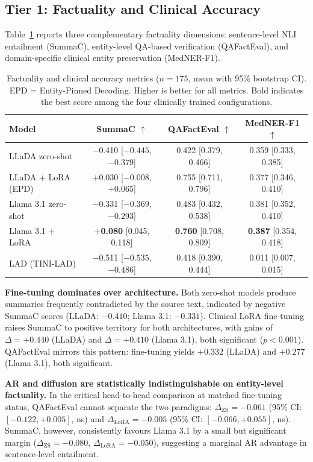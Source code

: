\documentclass[11pt]{article}
\begin{document}
\subsection{Tier 1: Factuality and Clinical Accuracy}

Table~\ref{tab:factuality} reports three complementary factuality dimensions:
sentence-level NLI entailment (SummaC), entity-level QA-based verification
(QAFactEval), and domain-specific clinical entity preservation (MedNER-F1).

\begin{table}[htbp]
\small
\centering
\begin{tabular}{lccc}
\hline
\textbf{Model} & \textbf{SummaC} $\uparrow$ & \textbf{QAFactEval} $\uparrow$ & \textbf{MedNER-F1} $\uparrow$ \\
\hline
LLaDA zero-shot      & $-$0.410 [$-0.445$, $-0.379$] & 0.422 [0.379, 0.466] & 0.359 [0.333, 0.385] \\
LLaDA + LoRA (EPD)   & $+$0.030 [$-0.008$, $+0.065$] & 0.755 [0.711, 0.796] & 0.377 [0.346, 0.410] \\
Llama 3.1 zero-shot  & $-$0.331 [$-0.369$, $-0.293$] & 0.483 [0.432, 0.538] & 0.381 [0.352, 0.410] \\
Llama 3.1 + LoRA     & \textbf{$+$0.080} [0.045, 0.118] & \textbf{0.760} [0.708, 0.809] & \textbf{0.387} [0.354, 0.418] \\
\hline
LAD (TINI-LAD)       & $-$0.511 [$-0.535$, $-0.486$] & 0.418 [0.390, 0.444] & 0.011 [0.007, 0.015] \\
\hline
\end{tabular}
\caption{Factuality and clinical accuracy metrics ($n=175$, mean with 95\% bootstrap CI). EPD = Entity-Pinned Decoding. Higher is better for all metrics. Bold indicates the best score among the four clinically trained configurations.}
\label{tab:factuality}
\end{table}

\textbf{Fine-tuning dominates over architecture.}
Both zero-shot models produce summaries frequently contradicted by the source
text, indicated by negative SummaC scores (LLaDA: $-0.410$; Llama 3.1:
$-0.331$). Clinical LoRA fine-tuning raises SummaC to positive territory for
both architectures, with gains of $\Delta = +0.440$ (LLaDA) and
$\Delta = +0.410$ (Llama 3.1), both significant ($p < 0.001$).
QAFactEval mirrors this pattern: fine-tuning yields $+0.332$ (LLaDA) and
$+0.277$ (Llama 3.1), both significant.

\textbf{AR and diffusion are statistically indistinguishable on entity-level factuality.}
In the critical head-to-head comparison at matched fine-tuning status,
QAFactEval cannot separate the two paradigms: $\Delta_{\mathrm{ZS}} = -0.061$
(95\% CI: $[-0.122, +0.005]$, ns) and $\Delta_{\mathrm{LoRA}} = -0.005$
(95\% CI: $[-0.066, +0.055]$, ns). SummaC, however, consistently favours
Llama 3.1 by a small but significant margin
($\Delta_{\mathrm{ZS}} = -0.080$, $\Delta_{\mathrm{LoRA}} = -0.050$),
suggesting a marginal AR advantage in sentence-level entailment.
\end{document}
